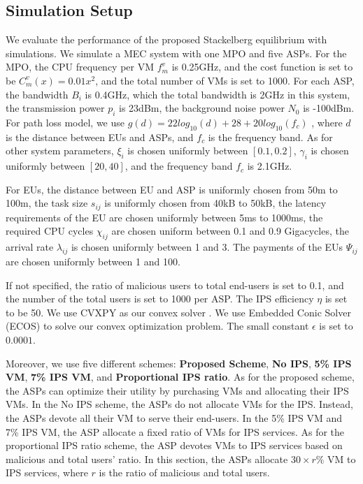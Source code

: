 \documentclass[conference]{IEEEtran}
\begin{document}
\subsection{Simulation Setup}
We evaluate the performance of the proposed Stackelberg equilibrium with simulations. We simulate a MEC system with one MPO and five ASPs. For the MPO, the CPU frequency per VM $f_m^v$ is 0.25GHz, and the cost function is set to be $C_m^v(x) = 0.01x^2$, and the total number of VMs is set to 1000. For each ASP, the bandwidth $B_i$ is 0.4GHz, which the total bandwidth is 2GHz in this system, the transmission power $p_i$ is 23dBm\cite{3gpp.36.101}, the background noise power $N_0$ is -100dBm\cite{chen2015efficient}. For path loss model, we use $g(d)=22log_{10}(d)+28+20log_{10}(f_c)$ \cite{3gpp.36.814}, where $d$ is the distance between EUs and ASPs, and $f_c$ is the frequency band. As for other system parameters, $\xi_{i}$ is chosen uniformly between $[0.1, 0.2]$, $\gamma_i$ is chosen uniformly between $[20, 40]$, and the frequency band $f_c$ is 2.1GHz.

For EUs, the distance between EU and ASP is uniformly chosen from 50m to 100m, the task size $s_{ij}$ is uniformly chosen from 40kB to 50kB, the latency requirements of the EU are chosen uniformly between 5ms to 1000ms, the required CPU cycles $\chi_{ij}$ are chosen uniform between 0.1 and 0.9 Gigacycles, the arrival rate $\lambda_{ij}$ is chosen uniformly between 1 and 3\cite{fan2018application}. The payments of the EUs $\Psi_{ij}$ are chosen uniformly between 1 and 100.

If not specified, the ratio of malicious users to total end-users is set to 0.1, and the number of the total users is set to 1000 per ASP. The IPS efficiency $\eta$ is set to be 50. We use CVXPY \cite{diamond2016cvxpy} \cite{agrawal2018rewriting} as our convex solver . We use Embedded Conic Solver (ECOS) \cite{bib:Domahidi2013ecos} to solve our convex optimization problem. The small constant $\epsilon$ is set to $0.0001$. 

Moreover, we use five different schemes: \textbf{Proposed Scheme}, \textbf{No IPS}, \textbf{5\% IPS VM}, \textbf{7\% IPS VM}, and \textbf{Proportional IPS ratio}. As for the proposed scheme, the ASPs can optimize their utility by purchasing VMs and allocating their IPS VMs. In the No IPS scheme, the ASPs do not allocate VMs for the IPS. Instead, the ASPs devote all their VM to serve their end-users. In the 5\% IPS VM and 7\% IPS VM, the ASP allocate a fixed ratio of VMs for IPS services. As for the proportional IPS ratio scheme, the ASP devotes VMs to IPS services based on malicious and total users' ratio. In this section, the ASPs allocate $30 \times r \%$ VM to IPS services, where $r$ is the ratio of malicious and total users.
\end{document}
